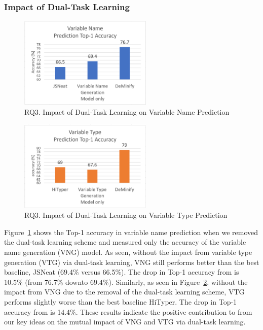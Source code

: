 \subsubsection{Impact of Dual-Task Learning}
\label{sec:dual-task-result}


\begin{figure}[thbp]
\begin{center}
\includegraphics[width=2.5in]{figures/dual-task-result-11}
\vspace{-8pt}
\caption{RQ3. Impact of Dual-Task Learning on Variable Name Prediction}
\label{dual-task-result-1}
\end{center}
\end{figure}

\begin{figure}[thbp]
\begin{center}
\includegraphics[width=2.5in]{figures/dual-task-result-22}
\vspace{-8pt}
\caption{RQ3. Impact of Dual-Task Learning on Variable Type Prediction}
\label{dual-task-result-2}
\end{center}
\end{figure}

Figure~\ref{dual-task-result-1} shows the Top-1 accuracy in variable
name prediction when we removed the dual-task learning scheme and
measured only the accuracy of the variable name generation (VNG)
model.  As seen, without the impact from variable type generation
(VTG) via dual-task learning, VNG still performs better than the best
baseline, JSNeat (69.4\% versus 66.5\%). The drop in Top-1 accuracy
from {\tool} is 10.5\% (from 76.7\% downto 69.4\%). Similarly, as seen
in Figure~\ref{dual-task-result-2}, without the impact from VNG due to
the removal of the dual-task learning scheme, VTG performs slightly
worse than the best baseline HiTyper. The drop in Top-1 accuracy from
{\tool} is 14.4\%.  These results indicate the positive contribution to {\tool}
from our key ideas on the mutual impact of VNG and VTG via dual-task
learning.
